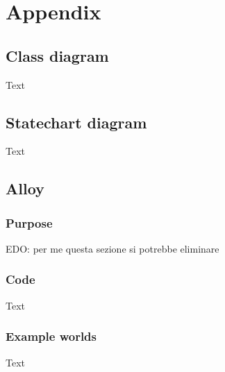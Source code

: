 \section{Appendix}
\subsection{Class diagram}
Text

\newpage
\subsection{Statechart diagram}
Text

\newpage
\subsection{Alloy}


\newpage
\subsubsection{Purpose}
EDO: per me questa sezione si potrebbe eliminare

\newpage
\subsubsection{Code}
Text

\newpage
\subsubsection{Example worlds}
Text